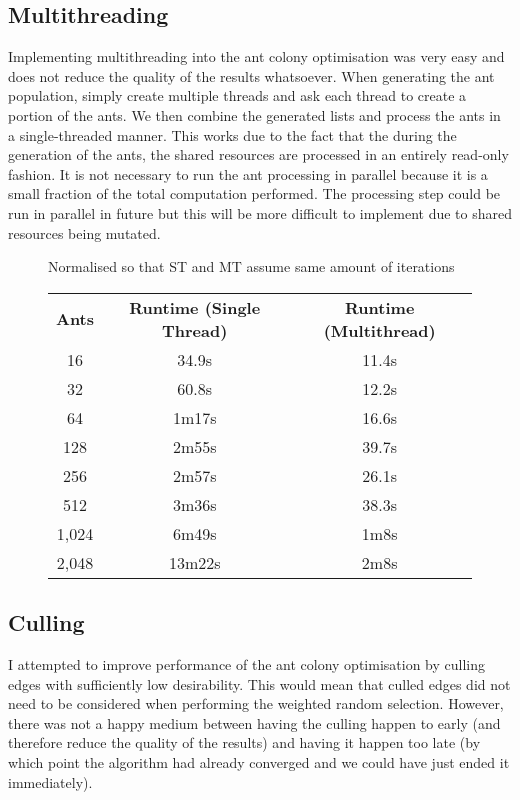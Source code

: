 \documentclass[a4paper, 11pt,table]{article}
\begin{document}
\subsection{Multithreading}
Implementing multithreading into the ant colony optimisation was very easy and does not reduce the quality of the results whatsoever. When generating the ant population, simply create multiple threads and ask each thread to create a portion of the ants. We then combine the generated lists and process the ants in a single-threaded manner. This works due to the fact that the during the generation of the ants, the shared resources are processed in an entirely read-only fashion. It is not necessary to run the ant processing in parallel because it is a small fraction of the total computation performed. The processing step could be run in parallel in future but this will be more difficult to implement due to shared resources being mutated.

\begin{figure}
	\begin{center}
		Normalised so that ST and MT assume same amount of iterations
		
		\begin{tabu}{|c c c|}
			\textbf{Ants} & \textbf{Runtime (Single Thread)} & \textbf{Runtime (Multithread)} \\
			16 & 34.9s & 11.4s \\
			32 & 60.8s & 12.2s \\
			64 & 1m17s & 16.6s \\
			128 & 2m55s & 39.7s \\
			256 & 2m57s & 26.1s \\
			512 & 3m36s & 38.3s \\
			1,024 & 6m49s & 1m8s \\
			2,048 & 13m22s & 2m8s \\
		\end{tabu}
	\end{center}
\end{figure}

\subsection{Culling}
I attempted to improve performance of the ant colony optimisation by culling edges with sufficiently low desirability. This would mean that culled edges did not need to be considered when performing the weighted random selection. However, there was not a happy medium between having the culling happen to early (and therefore reduce the quality of the results) and having it happen too late (by which point the algorithm had already converged and we could have just ended it immediately).
\end{document}
